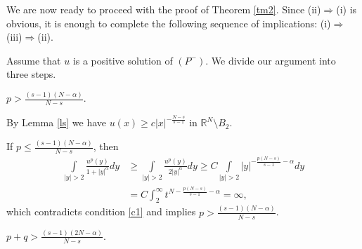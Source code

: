 \documentclass[leqno,12pt]{article}
\numberwithin{equation}{section}
\newcommand{\R}{\mathbb R}
\begin{document}
We are now ready to proceed with the proof of Theorem \ref{tm2}. Since (ii)$\Longrightarrow$(i) is obvious, it is enough to complete the following sequence of implications: (i)$\Longrightarrow$(iii)$\Longrightarrow$(ii).


 Assume that $u$ is a positive solution of  $(P^-)$. We divide our argument into three steps.

\smallskip

 $p> \frac{(s-1)(N-\alpha)}{N-s}$.

By Lemma \ref{ls} we have $u(x)\geq c|x|^{-\frac{N-s}{s-1}}$ in $\R^N\setminus B_{2}$.

If $p\leq \frac{(s-1)(N-\alpha)}{N-s}$, then
$$
\begin{aligned}
\int\limits_{|y|>2}\frac{u^{p}(y)}{1+|y|^{\alpha}}dy&\geq \int\limits_{|y|>2}\frac{u^{p}(y)}{2|y|^{\alpha}}dy \geq 
C\int\limits_{|y|>2}|y|^{-\frac{p(N-s)}{s-1}-\alpha}dy\\
&=C\int_{2}^\infty t^{N-\frac{p(N-s)}{s-1}-\alpha}=\infty,
\end{aligned}
$$
which contradicts condition \eqref{c1} and implies $p> \frac{(s-1)(N-\alpha)}{N-s}$.

\smallskip

 $p+q>\frac{(s-1)(2N-\alpha)}{N-s}$.
\end{document}
